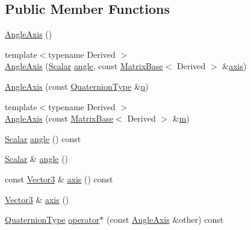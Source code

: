 \subsection*{Public Member Functions}
\begin{DoxyCompactItemize}
\item 
\hyperlink{class_angle_axis_a954085dd0a57d2c1cd09b874d9b53902}{Angle\-Axis} ()
\item 
{\footnotesize template$<$typename Derived $>$ }\\\hyperlink{class_angle_axis_ad4d89bef1139ded7937aff1ae9db0504}{Angle\-Axis} (\hyperlink{class_angle_axis_a6b92671c4ba67e688117dfb93215a895}{Scalar} \hyperlink{glext_8h_a9e06c1f76a20fed54ca742cd25cb02c4}{angle}, const \hyperlink{class_matrix_base}{Matrix\-Base}$<$ Derived $>$ \&\hyperlink{class_angle_axis_ab6b0c95653bd4823fc0fd5c9adcb4adf}{axis})
\item 
\hyperlink{class_angle_axis_aa54e3df605fcf0e028aa7404f80494c6}{Angle\-Axis} (const \hyperlink{class_angle_axis_af3a8449f8ac6c99fa33cac3f390e97f4}{Quaternion\-Type} \&\hyperlink{glext_8h_afb30bc844faa48275d1c84294956a44b}{q})
\item 
{\footnotesize template$<$typename Derived $>$ }\\\hyperlink{class_angle_axis_a920f3b4cadf01e81cf1e7579e929425b}{Angle\-Axis} (const \hyperlink{class_matrix_base}{Matrix\-Base}$<$ Derived $>$ \&\hyperlink{glext_8h_af593500c283bf1a787a6f947f503a5c2}{m})
\item 
\hyperlink{class_angle_axis_a6b92671c4ba67e688117dfb93215a895}{Scalar} \hyperlink{class_angle_axis_a056fb65c28e6626a6c52fe6eab5829b9}{angle} () const 
\item 
\hyperlink{class_angle_axis_a6b92671c4ba67e688117dfb93215a895}{Scalar} \& \hyperlink{class_angle_axis_a8114af4a099e9469889185ca9c29c452}{angle} ()
\item 
const \hyperlink{class_angle_axis_a56196b7afb477e4f60bc8819cf63c6ec}{Vector3} \& \hyperlink{class_angle_axis_ab6b0c95653bd4823fc0fd5c9adcb4adf}{axis} () const 
\item 
\hyperlink{class_angle_axis_a56196b7afb477e4f60bc8819cf63c6ec}{Vector3} \& \hyperlink{class_angle_axis_aa3f542bcafeb47d2bc10640e5326e87e}{axis} ()
\item 
\hyperlink{class_angle_axis_af3a8449f8ac6c99fa33cac3f390e97f4}{Quaternion\-Type} \hyperlink{class_angle_axis_ab3753552ba68dfeb5e96a1b0cf8f13d3}{operator$\ast$} (const \hyperlink{class_angle_axis}{Angle\-Axis} \&other) const 
\item 

\end{DoxyCompactItemize}
